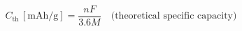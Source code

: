\documentclass[preview]{standalone}
\begin{document}
\[C_\text{th} \, [\text{mAh/g}] = \frac{nF}{3.6 M} \quad \text{(theoretical specific capacity)}\]
\end{document}
